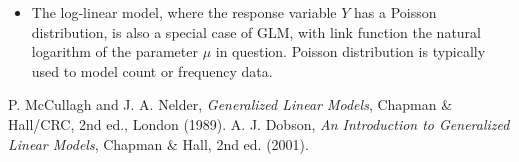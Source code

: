 \documentclass[12pt]{article}
\begin{document}
\begin{itemize}
\item The log-linear model, where the response variable $Y$ has a Poisson distribution, is also a special case of GLM, with link function the natural logarithm of the parameter $\mu$ in question.  Poisson distribution is typically used to model count or frequency data.
\end{itemize}
\par
\begin{thebibliography}{8}
 P. McCullagh and J. A. Nelder, {\em Generalized Linear Models}, Chapman \& Hall/CRC, 2nd ed., London (1989).
 A. J. Dobson, {\em An Introduction to Generalized Linear Models}, Chapman \& Hall, 2nd ed. (2001).
\end{thebibliography}
\end{document}
